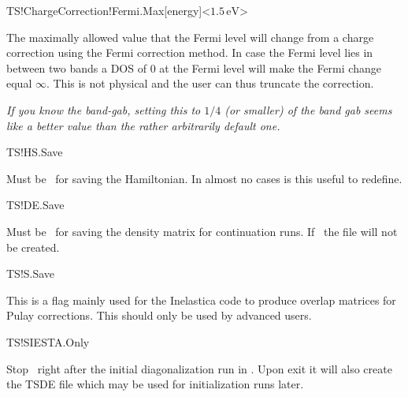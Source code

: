 \begin{fdfentry}{TS!ChargeCorrection!Fermi.Max}[energy]<$1.5\,\mathrm{eV}$>%

  The maximally allowed value that the Fermi level will change from a
  charge correction using the Fermi correction method. In case the
  Fermi level lies in between two bands a DOS of $0$ at the Fermi
  level will make the Fermi change equal $\infty$. This is not
  physical and the user can thus truncate the correction.
  
  \emph{If you know the band-gab, setting this to $1/4$ (or smaller)
      of the band gab seems like a better value than the rather
      arbitrarily default one.}

\end{fdfentry}

\begin{fdflogicalT}{TS!HS.Save}

  Must be \fdftrue\ for saving the Hamiltonian. In almost no cases
  is this useful to redefine.

\end{fdflogicalT}  

\begin{fdflogicalT}{TS!DE.Save}

  Must be \fdftrue\ for saving the density matrix for continuation
  runs. If \fdffalse\ the  file will not be created.

\end{fdflogicalT}  

\begin{fdflogicalF}{TS!S.Save}

  This is a flag mainly used for the Inelastica code to produce
  overlap matrices for Pulay corrections. This should only be used by
  advanced users.

\end{fdflogicalF}


\begin{fdflogicalF}{TS!SIESTA.Only}

  Stop \tsiesta\ right after the initial diagonalization run in
  \siesta. Upon exit it will also create the TSDE file which may be
  used for initialization runs later.

\end{fdflogicalF}



